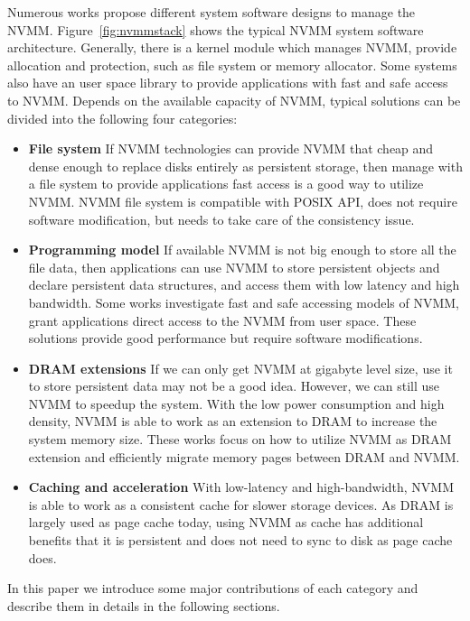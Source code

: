 Numerous works propose different system software designs to
manage the NVMM. Figure~\ref{fig:nvmmstack} shows the typical NVMM system
software architecture. Generally, there is a kernel module which manages
NVMM, provide allocation and protection, such as file system or memory
allocator. Some systems also have an user space library to provide applications
with fast and safe access to NVMM.
Depends on the available capacity of NVMM, typical solutions can be divided into
the following four categories:

\begin{itemize}
\item \textbf{File system} If NVMM technologies can provide NVMM
that cheap and dense enough to replace disks entirely as persistent storage,
then manage with a file system to provide applications
fast access is a good way to utilize NVMM. NVMM file system is compatible
with POSIX API, does not require software modification, but needs to take care
of the consistency issue.

\item \textbf{Programming model} If available NVMM is not big enough to store
all the file data, then applications can use NVMM to store persistent objects
and declare persistent
data structures, and access them with low latency and high bandwidth.
Some works investigate fast and safe accessing models of
NVMM, grant applications direct access to the NVMM from user space. 
These solutions provide good performance but require software modifications.

\item \textbf{DRAM extensions} If we can only get NVMM at gigabyte level size,
use it to store persistent data may not be a good idea. However, we can still
use NVMM to speedup the system. With the low power consumption and high density,
NVMM is able to work as an extension to DRAM to increase the system memory
size. These
works focus on how to utilize NVMM as DRAM extension and efficiently
migrate memory pages between DRAM and NVMM.

\item \textbf{Caching and acceleration} With low-latency and high-bandwidth,
NVMM is able to work as a consistent cache for slower storage devices. As
DRAM is largely used as page cache today, using NVMM as cache has additional
benefits that it is persistent and does not need to sync to disk as page cache
does.

\end{itemize}  

In this paper we introduce some major contributions of each category
and describe them in details in the following sections.

